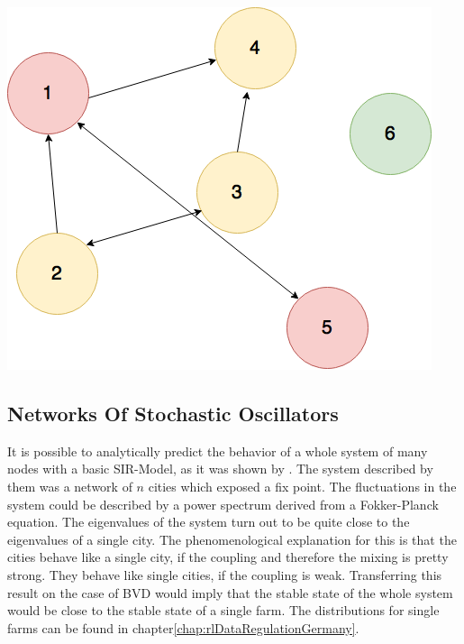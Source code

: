 \begin{minipage}{1.0\textwidth}


\begin{minipage}{0.5\textwidth}
\noindent\includegraphics[width=0.9\linewidth,height=\textheight,
keepaspectratio]{Graph4.png} 
\end{minipage}
\end{minipage}


\subsection{Networks Of Stochastic Oscillators}
It is possible to analytically predict the behavior of a whole system of many nodes with a basic SIR-Model, as it was shown by \citep{ROZ11}. The system described by them was a network of $n$ cities which exposed a fix point. The fluctuations in the system could be described by a power spectrum derived from a Fokker-Planck equation. The eigenvalues of the system turn out to be quite close to the eigenvalues of a single city. The phenomenological explanation for this is that the cities behave like a single city, if the coupling and therefore the mixing is pretty strong. They behave like single cities, if the coupling is weak. Transferring this result on the case of BVD would imply that the stable state of the whole system would be close to the stable state of a single farm. The distributions for single farms can be found in chapter\ref{chap:rlDataRegulationGermany}.